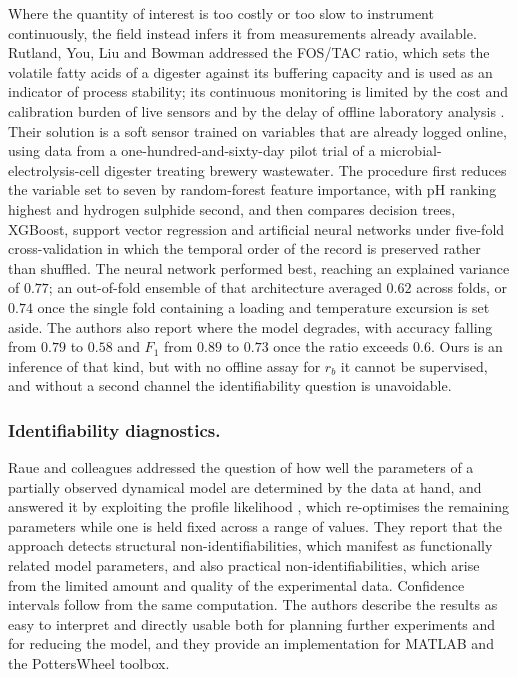 \documentclass[sigconf]{acmart}
\newcommand{\rb}{\ensuremath{r_{b}}}
\begin{document}
Where the quantity of interest is too costly or too slow to instrument
continuously, the field instead infers it from measurements already
available. Rutland, You, Liu and Bowman addressed the FOS/TAC ratio,
which sets the volatile fatty acids of a digester against its
buffering capacity and is used as an indicator of process stability;
its continuous monitoring is limited by the cost and calibration
burden of live sensors and by the delay of offline laboratory
analysis \cite{rutland2025application}. Their solution is a soft sensor
trained on variables that are already logged online, using data from a
one-hundred-and-sixty-day pilot trial of a microbial-electrolysis-cell
digester treating brewery wastewater. The procedure first reduces the
variable set to seven by random-forest feature importance, with pH
ranking highest and hydrogen sulphide second, and then compares
decision trees, XGBoost, support vector regression and artificial
neural networks under five-fold cross-validation in which the temporal
order of the record is preserved rather than shuffled. The neural
network performed best, reaching an explained variance of $0.77$; an
out-of-fold ensemble of that architecture averaged $0.62$ across folds,
or $0.74$ once the single fold containing a loading and temperature
excursion is set aside. The authors also report where the model
degrades, with accuracy falling from $0.79$ to $0.58$ and $F_1$ from
$0.89$ to $0.73$ once the ratio exceeds $0.6$. Ours is an inference of
that kind, but with no offline assay for \rb{} it cannot be supervised,
and without a second channel the identifiability question is
unavoidable.

\subsubsection{Identifiability diagnostics.}
Raue and colleagues addressed the question of how well the parameters
of a partially observed dynamical model are determined by the data at
hand, and answered it by exploiting the profile
likelihood \cite{raue2009structural}, which re-optimises the remaining
parameters while one is held fixed across a range of values. They
report that the approach detects structural non-identifiabilities,
which manifest as functionally related model parameters, and also
practical non-identifiabilities, which arise from the limited amount
and quality of the experimental data. Confidence intervals follow from
the same computation. The authors describe the results as easy to
interpret and directly usable both for planning further experiments and
for reducing the model, and they provide an implementation for MATLAB
and the PottersWheel toolbox.
\end{document}
